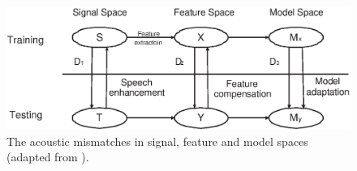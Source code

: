 
\begin{figure}
\centerline{
\includegraphics[scale=0.8]{mismatch.eps}}
\vspace*{-2ex} \caption[The acoustic mismatches in signal, feature
and model spaces]{The acoustic mismatches in signal, feature and
model spaces (adapted from \cite{Lee98Review}).}
\label{fig:ch2:mismatch}
\end{figure}
